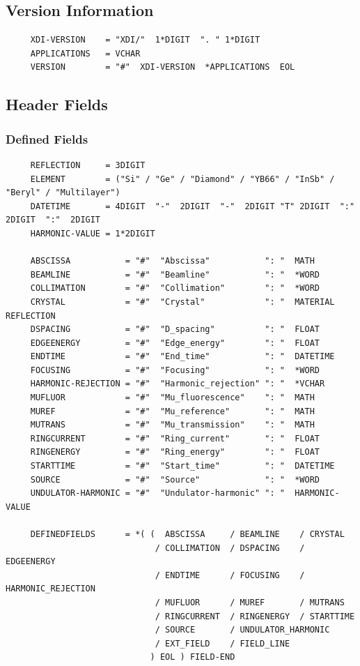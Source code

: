 \documentclass{article}
\begin{document}
\subsection{Version Information}
\label{apdx:gram_version}
\begin{verbatim}
     XDI-VERSION    = "XDI/"  1*DIGIT  ". " 1*DIGIT
     APPLICATIONS   = VCHAR
     VERSION        = "#"  XDI-VERSION  *APPLICATIONS  EOL
\end{verbatim}

\subsection{Header Fields}
\label{apdx:gram_hdr_fields}

\subsubsection{Defined Fields}
\label{apdx:gram_hdr_defined}
\begin{verbatim}
     REFLECTION     = 3DIGIT
     ELEMENT        = ("Si" / "Ge" / "Diamond" / "YB66" / "InSb" / "Beryl" / "Multilayer")
     DATETIME       = 4DIGIT  "-"  2DIGIT  "-"  2DIGIT "T" 2DIGIT  ":"  2DIGIT  ":"  2DIGIT
     HARMONIC-VALUE = 1*2DIGIT

     ABSCISSA           = "#"  "Abscissa"           ": "  MATH
     BEAMLINE           = "#"  "Beamline"           ": "  *WORD
     COLLIMATION        = "#"  "Collimation"        ": "  *WORD
     CRYSTAL            = "#"  "Crystal"            ": "  MATERIAL  REFLECTION
     DSPACING           = "#"  "D_spacing"          ": "  FLOAT
     EDGEENERGY         = "#"  "Edge_energy"        ": "  FLOAT
     ENDTIME            = "#"  "End_time"           ": "  DATETIME
     FOCUSING           = "#"  "Focusing"           ": "  *WORD
     HARMONIC-REJECTION = "#"  "Harmonic_rejection" ": "  *VCHAR
     MUFLUOR            = "#"  "Mu_fluorescence"    ": "  MATH
     MUREF              = "#"  "Mu_reference"       ": "  MATH
     MUTRANS            = "#"  "Mu_transmission"    ": "  MATH
     RINGCURRENT        = "#"  "Ring_current"       ": "  FLOAT
     RINGENERGY         = "#"  "Ring_energy"        ": "  FLOAT
     STARTTIME          = "#"  "Start_time"         ": "  DATETIME
     SOURCE             = "#"  "Source"             ": "  *WORD
     UNDULATOR-HARMONIC = "#"  "Undulator-harmonic" ": "  HARMONIC-VALUE

     DEFINEDFIELDS      = *( (  ABSCISSA     / BEAMLINE    / CRYSTAL
                              / COLLIMATION  / DSPACING    / EDGEENERGY
                              / ENDTIME      / FOCUSING    / HARMONIC_REJECTION
                              / MUFLUOR      / MUREF       / MUTRANS
                              / RINGCURRENT  / RINGENERGY  / STARTTIME 
                              / SOURCE       / UNDULATOR_HARMONIC
                              / EXT_FIELD    / FIELD_LINE
                             ) EOL ) FIELD-END
\end{verbatim}
\end{document}
